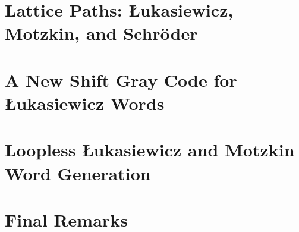 \chapter{Lattice Paths: Łukasiewicz, Motzkin, and Schröder} \label{chap:luka-background}
 

\chapter{A New Shift Gray Code for Łukasiewicz Words} \label{chap:luka-graycode}

\chapter{Loopless Łukasiewicz and Motzkin Word Generation} \label{chap:luka-implementation}


\chapter{Final Remarks}






